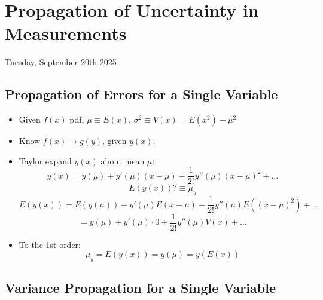\section{Propagation of Uncertainty in Measurements}

Tuesday, September 20th 2025

\subsection{Propagation of Errors for a Single Variable}

\begin{itemize}
    \item Given $f(x)$ pdf, $\mu \equiv E(x)$, $\sigma^2 \equiv V(x) = E(x^2) - \mu^2$
    \item Know $f(x) \rightarrow g(y)$, given $y(x)$.
    \item Taylor expand $y(x)$ about mean $\mu$:
          \[ y(x) = y(\mu) + y'(\mu) (x - \mu) + \frac{1}{2!} y''(\mu) (x - \mu)^2 + \ldots \]
          \[ E(y(x)) ? \equiv \mu_y \]
          \[ E(y(x)) = E(y(\mu)) + y'(\mu) E(x - \mu) + \frac{1}{2!} y''(\mu) E((x - \mu)^2) + \ldots \]
          \[ = y(\mu) + y'(\mu) \cdot 0 + \frac{1}{2!} y''(\mu) V(x)+ \ldots \]

    \item To the 1st order:
          \[ \mu_y = E(y(x)) = y(\mu) = y(E(x)) \]
\end{itemize}

\subsection{Variance Propagation for a Single Variable}

